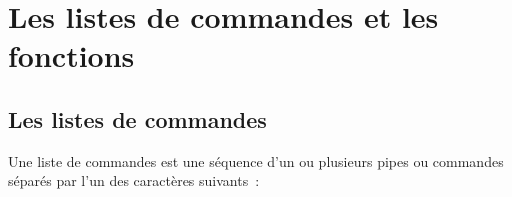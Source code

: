 %
%

\setcounter{remarque-cnt}{1}
\setcounter{example-cnt}{1}
\chapter{\label{listfcts}Les listes de commandes et les fonctions}
\thispagestyle{fancy}

\section{Les listes de commandes}

Une liste de commandes est une s{\'e}quence d'un
ou plusieurs pipes  ou commandes s{\'e}par{\'e}s par l'un
des caract{\`e}res suivants~:


